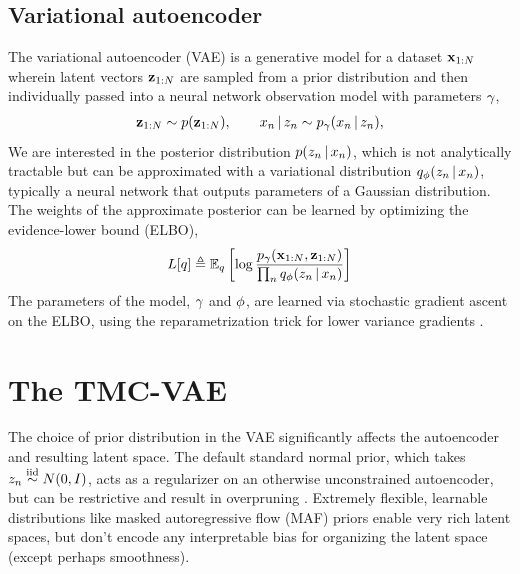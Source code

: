 \subsection{Variational autoencoder}
The variational autoencoder (VAE) is a generative model
for a dataset $\mathbf{x}_{1:N}$
wherein latent vectors $\mathbf{z}_{1:N}$ are sampled
from a prior distribution
and then individually passed into
a neural network observation model with parameters $\gamma$,
\begin{equation}
    \begin{split}
        \mathbf{z}_{1:N} \sim p(\mathbf{z}_{1:N}),
        \qquad
        x_n \,|\, z_n \sim p_\gamma(x_n \,|\, z_n),
    \end{split}
\end{equation}
We are interested in the posterior distribution
$p(z_n \,|\, x_n)$, which is not analytically tractable
but can be approximated with a variational distribution
$q_\phi(z_n \,|\, x_n)$, typically a neural network
that outputs parameters of a Gaussian distribution.
The weights of the approximate posterior can be learned
by optimizing the evidence-lower bound (ELBO),
\begin{equation}
    \begin{split}
    L[q] &\triangleq \mathbb{E}_q \left[\log \frac{p_\gamma(\mathbf{x}_{1:N}, \mathbf{z}_{1:N})}{\prod_n q_\phi(z_n \,|\, x_n)}\right] \\
    \end{split}
\end{equation}
The parameters of the model, $\gamma$ and $\phi$,
are learned via stochastic gradient ascent on
the ELBO, using the reparametrization trick
for lower variance gradients \citep{Kingma2014, Rezende2014}.

\section{The TMC-VAE}
\label{sec:tmc-vae}

The choice of prior distribution in the VAE significantly affects the autoencoder and resulting latent space.
The default standard normal prior, which takes $z_n \stackrel{\mathrm{iid}}{\sim} N(0, I)$, acts as a regularizer on an otherwise unconstrained autoencoder, but can be restrictive and result in overpruning \citep{Burda2015}.
Extremely flexible, learnable distributions like masked autoregressive flow (MAF) priors \citep{Papamakarios2017} enable very rich latent spaces, but don't encode any interpretable bias for organizing the latent space (except perhaps smoothness).

